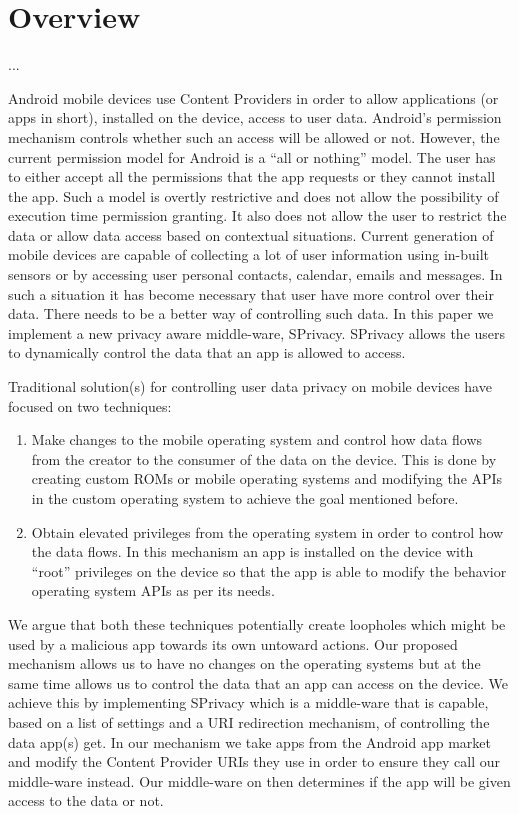 \section{Overview}
...

Android mobile devices use Content Providers in order to allow applications (or apps in short), installed on the device, access to user data. Android's permission mechanism controls whether such an access will be allowed or not. However, the current permission model for Android is a ``all or nothing'' model. The user has to either accept all the permissions that the app requests or they cannot install the app. Such a model is overtly restrictive and does not allow the possibility of execution time permission granting. It also does not allow the user to restrict the data or allow data access based on contextual situations. Current generation of mobile devices are capable of collecting a lot of user information using in-built sensors or by accessing user personal contacts, calendar, emails and messages. In such a situation it has become necessary that user have more control over their data. There needs to be a better way of controlling such data. In this paper we implement a new privacy aware middle-ware, SPrivacy. SPrivacy allows the users to dynamically control the data that an app is allowed to access. 

Traditional solution(s) for controlling user data privacy on mobile devices have focused on two techniques:
\begin{enumerate}
	\item Make changes to the mobile operating system and control how data flows from the creator to the consumer of the data on the device. This is done by creating custom ROMs or mobile operating systems and modifying the APIs in the custom operating system to achieve the goal mentioned before.
	\item Obtain elevated privileges from the operating system in order to control how the data flows. In this mechanism an app is installed on the device with ``root'' privileges on the device so that the app is able to modify the behavior operating system APIs as per its needs.
\end{enumerate}

We argue that both these techniques potentially create loopholes which might be used by a malicious app towards its own untoward actions. Our proposed mechanism allows us to have no changes on the operating systems but at the same time allows us to control the data that an app can access on the device. We achieve this by implementing SPrivacy which is a middle-ware that is capable, based on a list of settings and a URI redirection mechanism, of controlling the data app(s) get. In our mechanism we take apps from the Android app market and modify the Content Provider URIs they use in order to ensure they call our middle-ware instead. Our middle-ware on then determines if the app will be given access to the data or not.